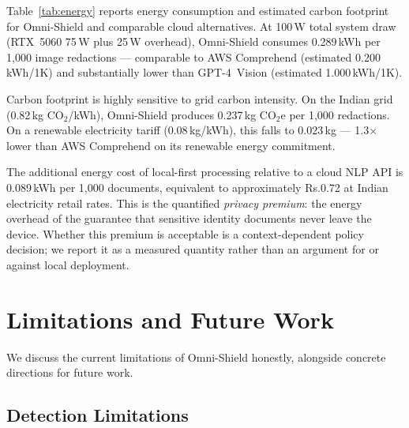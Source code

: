 \documentclass[conference]{IEEEtran}
\makeatletter
\newcommand{\rupee}{\textrm{Rs.\@}}
\makeatother
\begin{document}
Table~\ref{tab:energy} reports energy consumption
and estimated carbon footprint for Omni-Shield and
comparable cloud alternatives.
At 100\,W total system draw (RTX~5060 75\,W plus
25\,W overhead), Omni-Shield consumes 0.289\,kWh
per 1,000 image redactions --- comparable to AWS
Comprehend (estimated 0.200\,kWh/1K) and
substantially lower than GPT-4~Vision
(estimated 1.000\,kWh/1K).

Carbon footprint is highly sensitive to grid carbon
intensity.
On the Indian grid (0.82\,kg CO$_2$/kWh),
Omni-Shield produces 0.237\,kg CO$_2$e per 1,000
redactions.
On a renewable electricity tariff (0.08\,kg/kWh),
this falls to 0.023\,kg --- 1.3$\times$ lower than
AWS Comprehend on its renewable energy commitment.

The additional energy cost of local-first processing
relative to a cloud NLP API is 0.089\,kWh per 1,000
documents, equivalent to approximately \rupee0.72 at
Indian electricity retail rates.
This is the quantified \emph{privacy premium}: the
energy overhead of the guarantee that sensitive
identity documents never leave the device.
Whether this premium is acceptable is a
context-dependent policy decision; we report it
as a measured quantity rather than an argument for
or against local deployment.

\section{Limitations and Future Work}
\label{sec:limitations}

We discuss the current limitations of Omni-Shield
honestly, alongside concrete directions for future work.

\subsection{Detection Limitations}
\end{document}
